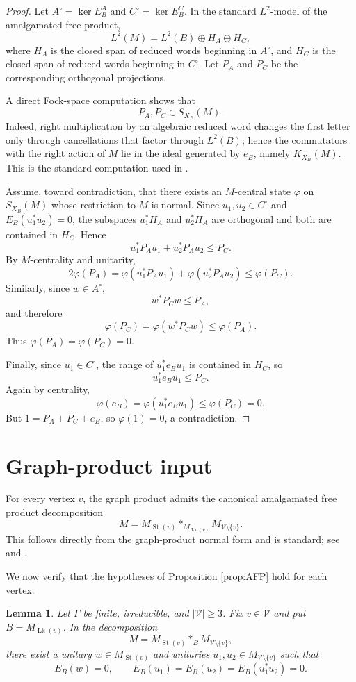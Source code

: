 \documentclass[11pt]{amsart}
\newtheorem{lemma}[theorem]{Lemma}
\theoremstyle{definition}
\newcommand{\V}{\mathcal V}
\newcommand{\Lk}{\operatorname{Lk}}
\newcommand{\St}{\operatorname{St}}
\newcommand{\freeprod}{\mathop{*}}
\begin{document}
\begin{proof}
Let $A^\circ=\ker E_B^A$ and $C^\circ=\ker E_B^C$.  In the standard $L^2$-model of the amalgamated free product,
\[
L^2(M)=L^2(B)\oplus H_A\oplus H_C,
\]
where $H_A$ is the closed span of reduced words beginning in $A^\circ$, and $H_C$ is the closed span of reduced words beginning in $C^\circ$.  Let $P_A$ and $P_C$ be the corresponding orthogonal projections.

A direct Fock-space computation shows that
\[
P_A,P_C\in S_{X_B}(M).
\]
Indeed, right multiplication by an algebraic reduced word changes the first letter only through cancellations that factor through $L^2(B)$; hence the commutators with the right action of $M$ lie in the ideal generated by $e_B$, namely $K_{X_B}(M)$.  This is the standard computation used in \cite[Section 6]{DKEP}.

Assume, toward contradiction, that there exists an $M$-central state $\varphi$ on $S_{X_B}(M)$ whose restriction to $M$ is normal.  Since $u_1,u_2\in C^\circ$ and $E_B(u_1^*u_2)=0$, the subspaces $u_1^*H_A$ and $u_2^*H_A$ are orthogonal and both are contained in $H_C$.  Hence
\[
u_1^*P_Au_1+u_2^*P_Au_2\leq P_C.
\]
By $M$-centrality and unitarity,
\[
2\varphi(P_A)
=
\varphi(u_1^*P_Au_1)+\varphi(u_2^*P_Au_2)
\leq \varphi(P_C).
\]
Similarly, since $w\in A^\circ$,
\[
w^*P_Cw\leq P_A,
\]
and therefore
\[
\varphi(P_C)=\varphi(w^*P_Cw)\leq \varphi(P_A).
\]
Thus $\varphi(P_A)=\varphi(P_C)=0$.

Finally, since $u_1\in C^\circ$, the range of $u_1^*e_Bu_1$ is contained in $H_C$, so
\[
u_1^*e_Bu_1\leq P_C.
\]
Again by centrality,
\[
\varphi(e_B)=\varphi(u_1^*e_Bu_1)\leq \varphi(P_C)=0.
\]
But $1=P_A+P_C+e_B$, so $\varphi(1)=0$, a contradiction.
\end{proof}

\section{Graph-product input}

For every vertex $v$, the graph product admits the canonical amalgamated free product decomposition
\[
M
=
M_{\St(v)}
\freeprod_{M_{\Lk(v)}}
M_{\V\setminus\{v\}}.
\]
This follows directly from the graph-product normal form and is standard; see \cite{CF} and \cite[Section 1.1]{CDHJKEN}.

We now verify that the hypotheses of Proposition \ref{prop:AFP} hold for each vertex.

\begin{lemma}\label{lem:unitaries}
Let $\Gamma$ be finite, irreducible, and $|\V|\geq 3$.  Fix $v\in\V$ and put $B=M_{\Lk(v)}$.  In the decomposition
\[
M
=
M_{\St(v)}
\freeprod_B
M_{\V\setminus\{v\}},
\]
there exist a unitary $w\in M_{\St(v)}$ and unitaries $u_1,u_2\in M_{\V\setminus\{v\}}$ such that
\[
E_B(w)=0,\qquad
E_B(u_1)=E_B(u_2)=E_B(u_1^*u_2)=0.
\]
\end{lemma}
\end{document}
